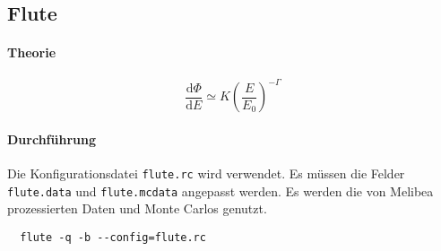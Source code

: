 \subsection{Flute}%
\label{sub:flute}
\paragraph{Theorie}%
\label{par:theorie}
\begin{equation}
\frac{\text{d} \Phi}{\text{d}E} \simeq K \left( \frac{E}{E_0} \right)^{- \Gamma}
\end{equation}


\paragraph{Durchführung}%

Die Konfigurationsdatei \texttt{flute.rc} wird verwendet.
Es müssen die Felder \texttt{flute.data} und \texttt{flute.mcdata} angepasst werden.
Es werden die von Melibea prozessierten Daten und Monte Carlos genutzt.


\begin{lstlisting}
  flute -q -b --config=flute.rc
\end{lstlisting}
